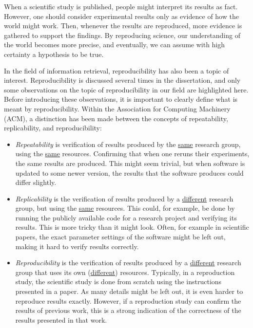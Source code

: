When a scientific study is published, people might interpret its results as fact. However, one should consider experimental results only as evidence of how the world might work. Then, whenever the results are reproduced, more evidence is gathered to support the findings. By reproducing science, our understanding of the world becomes more precise, and eventually, we can assume with high certainty a hypothesis to be true. 

In the field of information retrieval, reproducibility has also been a topic of interest. Reproducibility is discussed several times in the dissertation, and only some observations on the topic of reproducibility in our field are highlighted here. Before introducing these observations, it is important to clearly define what is meant by reproducibility. Within the Association for Computing Machinery (ACM), a distinction has been made between the concepts of repeatability, replicability, and reproducibility: 
\begin{itemize}
	\item \emph{Repeatability} is verification of results produced by the \underline{same} research group, using the \underline{same} resources. Confirming that when one reruns their experiments, the same results are produced. This might seem trivial, but when software is updated to some newer version, the results that the software produces could differ slightly. 
	\item \emph{Replicability} is the verification of results produced by a \underline{different} research group, but using the \underline{same} resources. This could, for example, be done by running the publicly available code for a research project and verifying its results. This is more tricky than it might look. Often, for example in scientific papers, the exact parameter settings of the software might be left out, making it hard to verify results correctly. 
	\item \emph{Reproducibility} is the verification of results produced by a \underline{different} research group that uses its own (\underline{different}) resources. Typically, in a reproduction study, the scientific study is done from scratch using the instructions presented in a paper. As many details might be left out, it is even harder to reproduce results exactly. However, if a reproduction study can confirm the results of previous work, this is a strong indication of the correctness of the results presented in that work.
\end{itemize}

